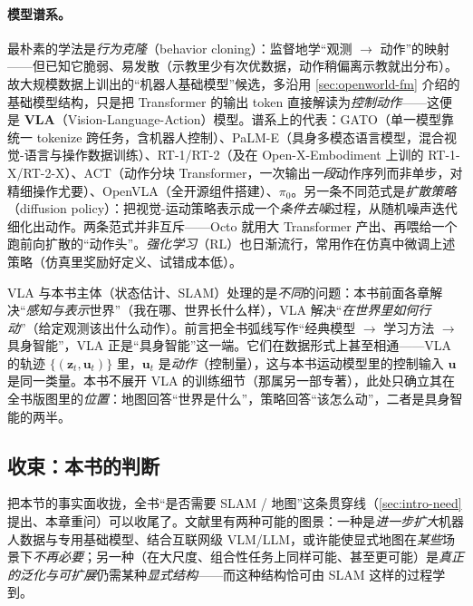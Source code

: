 \paragraph{模型谱系。}
最朴素的学法是\emph{行为克隆}（behavior cloning）：监督地学“观测 $\to$ 动作”的映射——但已知它脆弱、易发散（示教里少有次优数据，动作稍偏离示教就出分布）。故大规模数据上训出的“机器人基础模型”候选，多沿用 \cref{sec:openworld-fm} 介绍的基础模型结构，只是把 Transformer 的输出 token 直接解读为\emph{控制动作}——这便是 \textbf{VLA}（Vision-Language-Action）模型\cite{paull2026openworld}。谱系上的代表：GATO（单一模型靠统一 tokenize 跨任务，含机器人控制）、PaLM-E（具身多模态语言模型，混合视觉-语言与操作数据训练）、RT-1/RT-2（及在 Open-X-Embodiment 上训的 RT-1-X/RT-2-X）、ACT（动作分块 Transformer，一次输出\emph{一段}动作序列而非单步，对精细操作尤要）、OpenVLA（全开源组件搭建）、$\pi_0$。另一条不同范式是\emph{扩散策略}（diffusion policy）：把视觉-运动策略表示成一个\emph{条件去噪}过程，从随机噪声迭代细化出动作。两条范式并非互斥——Octo 就用大 Transformer 产出、再喂给一个跑前向扩散的“动作头”。\emph{强化学习}（RL）也日渐流行，常用作在仿真中微调上述策略（仿真里奖励好定义、试错成本低）。

\begin{note}
VLA 与本书主体（状态估计、SLAM）处理的是\emph{不同}的问题：本书前面各章解决“\emph{感知与表示}世界”（我在哪、世界长什么样），VLA 解决“\emph{在世界里如何行动}”（给定观测该出什么动作）。前言把全书弧线写作“经典模型 $\to$ 学习方法 $\to$ 具身智能”，VLA 正是“具身智能”这一端。它们在数据形式上甚至相通——VLA 的轨迹 $\{(\mathbf{z}_t,\mathbf{u}_t)\}$ 里，$\mathbf{u}_t$ 是\emph{动作}（控制量），这与本书运动模型里的控制输入 $\mathbf{u}$ 是同一类量。本书不展开 VLA 的训练细节（那属另一部专著），此处只确立其在全书版图里的\emph{位置}：地图回答“世界是什么”，策略回答“该怎么动”，二者是具身智能的两半。
\end{note}

\subsection{收束：本书的判断}
\label{sec:openworld-closing}

把本节的事实面收拢，全书“是否需要 SLAM / 地图”这条贯穿线（\cref{sec:intro-need} 提出、本章重问）可以收尾了。文献里有两种可能的图景\cite{paull2026openworld}：一种是\emph{进一步扩大}机器人数据与专用基础模型、结合互联网级 VLM/LLM，或许能使显式地图在\emph{某些}场景下\emph{不再必要}；另一种（在大尺度、组合性任务上同样可能、甚至更可能）是\emph{真正的泛化与可扩展}仍需某种\emph{显式结构}——而这种结构恰可由 SLAM 这样的过程学到。

